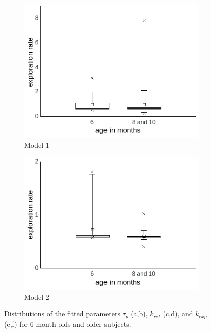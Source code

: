 \documentclass[a4paper]{scrreprt}
\begin{document}
\begin{figure}
        \begin{subfigure}[b]{0.49\textwidth}
        \includegraphics[width=\textwidth]{figs/sec3/age/age2_temp_mod1.jpeg}
        \caption{Model 1}
    \end{subfigure}
\begin{subfigure}[b]{0.49\textwidth}
        \includegraphics[width=\textwidth]{figs/sec3/age/age2_temp_mod2.jpeg}
        \caption{Model 2}
    \end{subfigure}
\caption{Distributions of the fitted parameters $\tau_p$ (a,b), $k_{ret}$ (c,d), and $k_{exp}$ (e,f) for 6-month-olds and older subjects.}
\label{fig:age2_params1}
\end{figure}
\end{document}
